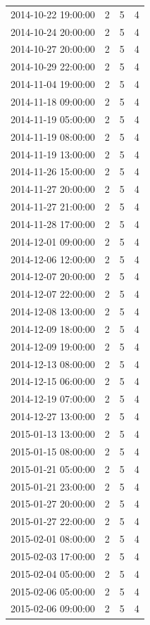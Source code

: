 \begin{tabular}{lrrr}
2014-10-22 19:00:00 & 2 & 5 & 4 \\
2014-10-24 20:00:00 & 2 & 5 & 4 \\
2014-10-27 20:00:00 & 2 & 5 & 4 \\
2014-10-29 22:00:00 & 2 & 5 & 4 \\
2014-11-04 19:00:00 & 2 & 5 & 4 \\
2014-11-18 09:00:00 & 2 & 5 & 4 \\
2014-11-19 05:00:00 & 2 & 5 & 4 \\
2014-11-19 08:00:00 & 2 & 5 & 4 \\
2014-11-19 13:00:00 & 2 & 5 & 4 \\
2014-11-26 15:00:00 & 2 & 5 & 4 \\
2014-11-27 20:00:00 & 2 & 5 & 4 \\
2014-11-27 21:00:00 & 2 & 5 & 4 \\
2014-11-28 17:00:00 & 2 & 5 & 4 \\
2014-12-01 09:00:00 & 2 & 5 & 4 \\
2014-12-06 12:00:00 & 2 & 5 & 4 \\
2014-12-07 20:00:00 & 2 & 5 & 4 \\
2014-12-07 22:00:00 & 2 & 5 & 4 \\
2014-12-08 13:00:00 & 2 & 5 & 4 \\
2014-12-09 18:00:00 & 2 & 5 & 4 \\
2014-12-09 19:00:00 & 2 & 5 & 4 \\
2014-12-13 08:00:00 & 2 & 5 & 4 \\
2014-12-15 06:00:00 & 2 & 5 & 4 \\
2014-12-19 07:00:00 & 2 & 5 & 4 \\
2014-12-27 13:00:00 & 2 & 5 & 4 \\
2015-01-13 13:00:00 & 2 & 5 & 4 \\
2015-01-15 08:00:00 & 2 & 5 & 4 \\
2015-01-21 05:00:00 & 2 & 5 & 4 \\
2015-01-21 23:00:00 & 2 & 5 & 4 \\
2015-01-27 20:00:00 & 2 & 5 & 4 \\
2015-01-27 22:00:00 & 2 & 5 & 4 \\
2015-02-01 08:00:00 & 2 & 5 & 4 \\
2015-02-03 17:00:00 & 2 & 5 & 4 \\
2015-02-04 05:00:00 & 2 & 5 & 4 \\
2015-02-06 05:00:00 & 2 & 5 & 4 \\
2015-02-06 09:00:00 & 2 & 5 & 4 \\

\end{tabular}
